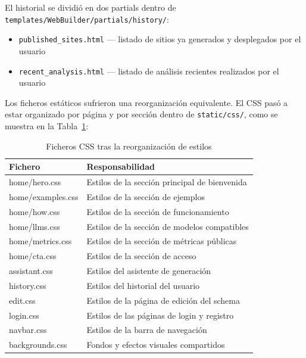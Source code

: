 El historial se dividió en dos partials dentro de \texttt{templates/WebBuilder/partials/history/}:

\begin{itemize}
    \item \texttt{published\_sites.html} — listado de sitios ya generados 
    y desplegados por el usuario
    \item \texttt{recent\_analysis.html} — listado de análisis recientes 
    realizados por el usuario
\end{itemize}

Los ficheros estáticos sufrieron una reorganización equivalente. 
El CSS pasó a estar organizado por página y por sección dentro de \texttt{static/css/}, como se muestra en la Tabla~\ref{tab:ficheros-css}:


\begin{table}[H]
    \centering
    \begin{tabular}{|l|p{8cm}|}
        \hline
        \textbf{Fichero} & \textbf{Responsabilidad} \\
        \hline
        home/hero.css & Estilos de la sección principal de bienvenida \\
        \hline
        home/examples.css & Estilos de la sección de ejemplos \\
        \hline
        home/how.css & Estilos de la sección de funcionamiento \\
        \hline
        home/llms.css & Estilos de la sección de modelos compatibles \\
        \hline
        home/metrics.css & Estilos de la sección de métricas públicas \\
        \hline
        home/cta.css & Estilos de la sección de acceso \\
        \hline
        assistant.css & Estilos del asistente de generación \\
        \hline
        history.css & Estilos del historial del usuario \\
        \hline
        edit.css & Estilos de la página de edición del schema \\
        \hline
        login.css & Estilos de las páginas de login y registro \\
        \hline
        navbar.css & Estilos de la barra de navegación \\
        \hline
        backgrounds.css & Fondos y efectos visuales compartidos \\
        \hline
    \end{tabular}
    \caption{Ficheros CSS tras la reorganización de estilos}
    \label{tab:ficheros-css}
\end{table}

